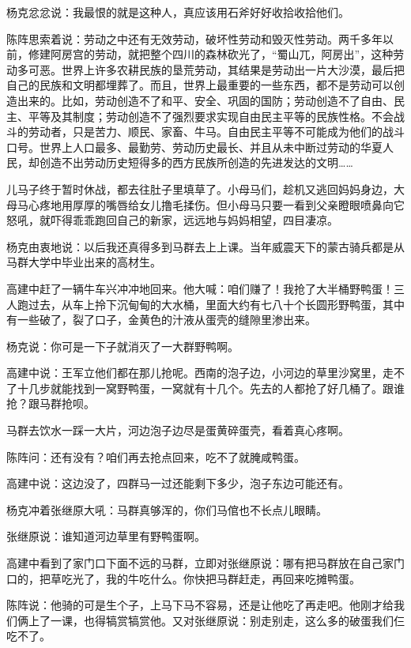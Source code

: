 \par 杨克忿忿说：我最恨的就是这种人，真应该用石斧好好收拾收拾他们。
\par 陈阵思索着说：劳动之中还有无效劳动，破坏性劳动和毁灭性劳动。两千多年以前，修建阿房宫的劳动，就把整个四川的森林砍光了，“蜀山兀，阿房出”，这种劳动多可恶。世界上许多农耕民族的垦荒劳动，其结果是劳动出一片大沙漠，最后把自己的民族和文明都埋葬了。而且，世界上最重要的一些东西，都不是劳动可以创造出来的。比如，劳动创造不了和平、安全、巩固的国防；劳动创造不了自由、民主、平等及其制度；劳动创造不了强烈要求实现自由民主平等的民族性格。不会战斗的劳动者，只是苦力、顺民、家畜、牛马。自由民主平等不可能成为他们的战斗口号。世界上人口最多、最勤劳、劳动历史最长、并且从未中断过劳动的华夏人民，却创造不出劳动历史短得多的西方民族所创造的先进发达的文明……
\par 儿马子终于暂时休战，都去往肚子里填草了。小母马们，趁机又逃回妈妈身边，大母马心疼地用厚厚的嘴唇给女儿撸毛揉伤。但小母马只要一看到父亲瞪眼喷鼻向它怒吼，就吓得乖乖跑回自己的新家，远远地与妈妈相望，四目凄凉。
\par 杨克由衷地说：以后我还真得多到马群去上上课。当年威震天下的蒙古骑兵都是从马群大学中毕业出来的高材生。
\par 
\par 高建中赶了一辆牛车兴冲冲地回来。他大喊：咱们赚了！我抢了大半桶野鸭蛋！三人跑过去，从车上拎下沉甸甸的大水桶，里面大约有七八十个长圆形野鸭蛋，其中有一些破了，裂了口子，金黄色的汁液从蛋壳的缝隙里渗出来。
\par 杨克说：你可是一下子就消灭了一大群野鸭啊。
\par 高建中说：王军立他们都在那儿抢呢。西南的泡子边，小河边的草里沙窝里，走不了十几步就能找到一窝野鸭蛋，一窝就有十几个。先去的人都抢了好几桶了。跟谁抢？跟马群抢呗。
\par 马群去饮水一踩一大片，河边泡子边尽是蛋黄碎蛋壳，看着真心疼啊。
\par 陈阵问：还有没有？咱们再去抢点回来，吃不了就腌咸鸭蛋。
\par 高建中说：这边没了，四群马一过还能剩下多少，泡子东边可能还有。
\par 杨克冲着张继原大吼：马群真够浑的，你们马倌也不长点儿眼睛。
\par 张继原说：谁知道河边草里有野鸭蛋啊。
\par 高建中看到了家门口下面不远的马群，立即对张继原说：哪有把马群放在自己家门口的，把草吃光了，我的牛吃什么。你快把马群赶走，再回来吃摊鸭蛋。
\par 陈阵说：他骑的可是生个子，上马下马不容易，还是让他吃了再走吧。他刚才给我们俩上了一课，也得犒赏犒赏他。又对张继原说：别走别走，这么多的破蛋我们仨吃不了。
